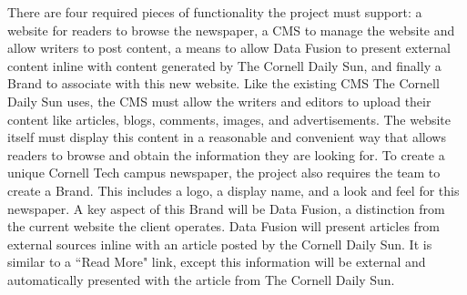 \documentclass[11pt]{article} %
\begin{document}
There are four required pieces of functionality the project must support: a website for readers to browse the newspaper, a CMS to manage the website and allow writers to post content, a means to allow Data Fusion to present external content inline with content generated by The Cornell Daily Sun, and finally a Brand to associate with this new website. Like the existing CMS The Cornell Daily Sun uses, the CMS must allow the writers and editors to upload their content like articles, blogs, comments, images, and advertisements. The website itself must display this content in a reasonable and convenient way that allows readers to browse and obtain the information they are looking for. To create a unique Cornell Tech campus newspaper, the project also requires the team to create a Brand. This includes a logo, a display name, and a look and feel for this newspaper. A key aspect of this Brand will be Data Fusion, a distinction from the current website the client operates. Data Fusion will present articles from external sources inline with an article posted by the Cornell Daily Sun. It is similar to a ``Read More" link, except this information will be external and automatically presented with the article from The Cornell Daily Sun.
                   
\end{document}
